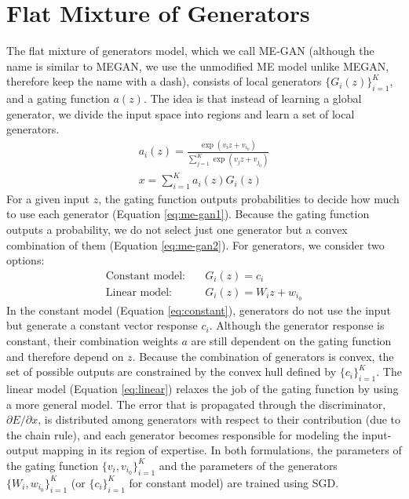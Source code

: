 \documentclass[a4paper,onesided,12pt]{report}
\begin{document}
\section{Flat Mixture of Generators}
\label{sec:me-gan}
The flat mixture of generators model, which we call ME-GAN (although the name is similar to MEGAN, we use the unmodified ME model unlike MEGAN, therefore keep the name with a dash), consists of local generators $\{G_i(z)\}_{i=1}^{K}$, and a gating function $a(z)$. The idea is that instead of learning a global generator, we divide the input space into regions and learn a set of local generators.
\begin{gather}
a_i(z) = \frac{\exp{(v_i z+v_{i_0})}}{\sum_{j=1}^K \exp{(v_j z+v_{j_0})}} \label{eq:me-gan1}\\
x = \sum_{i=1}^K a_i(z) G_i(z) \label{eq:me-gan2}
\end{gather}
For a given input $z$, the gating function outputs probabilities to decide how much to use each generator (Equation \ref{eq:me-gan1}). Because the gating function outputs a probability, we do not select just one generator but a convex combination of them (Equation \ref{eq:me-gan2}). For generators, we consider two options:
\begin{align}
\text{Constant model:} \quad & G_i(z) = c_i \label{eq:constant}\\
\text{Linear model:} \quad & G_i(z) = W_i z + w_{i_0} \label{eq:linear}
\end{align}
In the constant model (Equation \ref{eq:constant}), generators do not use the input but generate a constant vector response $c_i$. Although the generator response is constant, their combination weights $a$ are still dependent on the gating function and therefore depend on $z$. Because the combination of generators is convex, the set of possible outputs are constrained by the convex hull defined by $\{c_i\}_{i=1}^K$. The linear model (Equation \ref{eq:linear}) relaxes the job of the gating function by using a more general model. The error that is propagated through the discriminator, $\partial E / \partial x$, is distributed among generators with respect to their contribution (due to the chain rule), and each generator becomes responsible for modeling the input-output mapping in its region of expertise. In both formulations, the parameters of the gating function $\{v_i, v_{i_0}\}_{i=1}^K$ and the parameters of the generators $\{W_i, w_{i_0} \}_{i=1}^K$ (or $\{ c_i \}_{i=1}^K$ for constant model) are trained using SGD.
\end{document}
